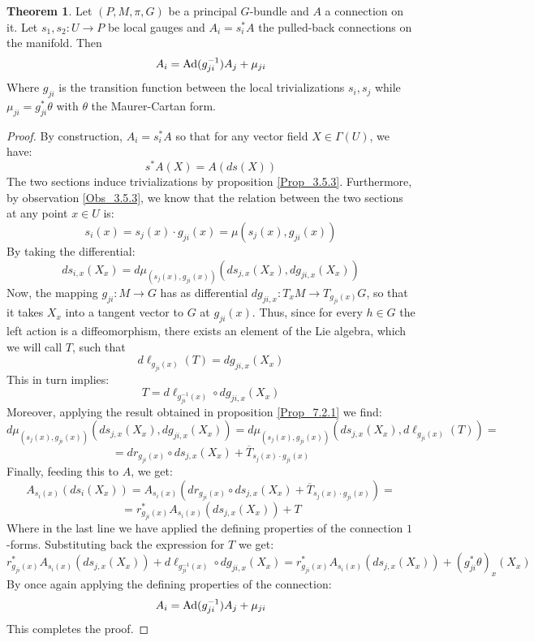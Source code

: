 \documentclass[12pt,a4paper]{report}
\theoremstyle{definition}
\theoremstyle{Theorem}
\newtheorem{Theo}[Def]{Theorem}
\theoremstyle{definition}
\theoremstyle{definition}
\begin{document}
	\begin{Theo} \label{Theo_7.2.1}
		Let $(P,M,\pi,G)$ be a principal $G$-bundle and $A$ a connection on it. Let $s_1,s_2:U\rightarrow P$ be local gauges and $A_{i}=s_i^*A$ the pulled-back connections on the manifold. Then 
		$$A_i=\hbox{Ad}(g_{ji}^{-1})A_j+\mu_{ji}$$
		Where $g_{ji}$ is the transition function between the local trivializations $s_i,s_j$ while $\mu_{ji}=g_{ji}^*\theta$ with $\theta$ the Maurer-Cartan form.
	\end{Theo}
	\begin{proof}
		By construction, $A_i=s_i^*A$ so that for any vector field $X\in \Gamma(U)$, we have:
		$$s^*A(X)=A(ds(X))$$
		The two sections induce trivializations by proposition \ref{Prop_3.5.3}. Furthermore, by observation \ref{Obs_3.5.3}, we know that the relation between the two sections at any point $x\in U$ is:
		$$s_i(x)=s_j(x)\cdot g_{ji}(x)=\mu(s_j(x),g_{ji}(x))$$
		By taking the differential:
		$$ds_{i,x}(X_x)=d\mu_{(s_{j}(x), g_{ji}(x))}(ds_{j,x}(X_x),dg_{ji,x}(X_x))$$
		Now, the mapping $g_{ji}:M\rightarrow G$ has as differential $dg_{ji,x}:T_xM\rightarrow T_{g_{ji}(x)}G$, so that it takes $X_x$ into a tangent vector to $G$ at $g_{ji}(x)$. Thus, since for every $h\in G$ the left action is a diffeomorphism, there exists an element of the Lie algebra, which we will call $T$, such that 
		$$d\ell_{g_{ji}(x)}(T)=dg_{ji,x}(X_x)$$
		This in turn implies:
		$$T=d\ell_{g^{-1}_{ji}(x)}\circ dg_{ji,x}(X_x)$$
		Moreover, applying the result obtained in proposition \ref{Prop_7.2.1} we find:
		$$d\mu_{(s_{j}(x), g_{ji}(x))}(ds_{j,x}(X_x),dg_{ji,x}(X_x))=d\mu_{(s_{j}(x), g_{ji}(x))}(ds_{j,x}(X_x),d\ell_{g_{ji}(x)}(T))=$$
		$$=dr_{g_{ji}(x)}\circ ds_{j,x}(X_x)+\overline{T}_{s_{j}(x)\cdot g_{ji}(x)}$$
		Finally, feeding this to $A$, we get:
		$$A_{s_i(x)}(ds_i(X_x))=A_{s_i(x)}(dr_{g_{ji}(x)}\circ ds_{j,x}(X_x)+\overline{T}_{s_{j}(x)\cdot g_{ji}(x)})=$$$$=r^*_{g_{ji}(x)}A_{{s_i(x)}}(ds_{j,x}(X_x))+T$$
		Where in the last line we have applied the defining properties of the connection $1$-forms. Substituting back the expression for $T$ we get:
		$$r^*_{g_{ji}(x)}A_{{s_i(x)}}(ds_{j,x}(X_x))+d\ell_{g^{-1}_{ji}(x)}\circ dg_{ji,x}(X_x)=r^*_{g_{ji}(x)}A_{{s_i(x)}}(ds_{j,x}(X_x))+(g^*_{ji}\theta)_x(X_x)$$
		By once again applying the defining properties of the connection:
		$$A_i=\hbox{Ad}(g_{ji}^{-1})A_j+\mu_{ji}$$
		This completes the proof.
	\end{proof}
\end{document}
